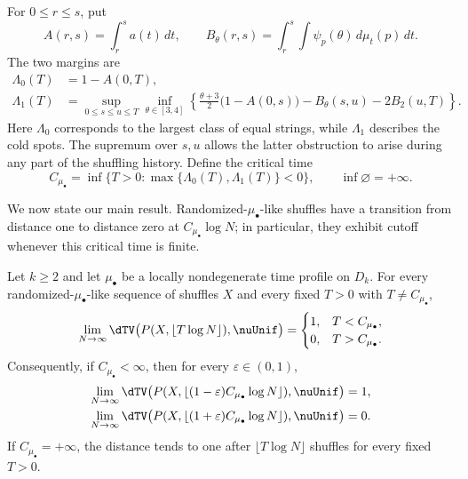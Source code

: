For $0\le r\le s$, put
\begin{equation}\label{eq:intro-integrated-costs}
 A(r,s)=\int_r^s a(t)\,dt,\qquad
 B_\theta(r,s)=\int_r^s\int\psi_p(\theta)\,d\mu_t(p)\,dt.
\end{equation}
The two margins are
\begin{align}
 \Lambda_0(T)&=1-A(0,T),\label{eq:intro-largest-margin}\\
 \Lambda_1(T)&=\sup_{0\le s\le u\le T}\inf_{\theta\in[3,4]}
 \left\{\frac{\theta+3}{2}\bigl(1-A(0,s)\bigr)
        -B_\theta(s,u)-2B_2(u,T)\right\}.
 \label{eq:intro-cold-margin}
\end{align}
Here $\Lambda_0$ corresponds to the largest class of equal strings,
while $\Lambda_1$ describes the cold spots. The supremum over $s,u$
allows the latter obstruction to arise during any part of the shuffling
history. Define the critical time
\begin{equation}\label{eq:profile-critical-time}
 C_{\mu_\bullet}
 =\inf\{T>0:\max\{\Lambda_0(T),\Lambda_1(T)\}<0\},
 \qquad \inf\varnothing=+\infty.
\end{equation}

We now state our main result. Randomized-$\mu_\bullet$-like shuffles
have a transition from distance one to distance zero at
$C_{\mu_\bullet}\log N$; in particular, they exhibit cutoff whenever
this critical time is finite.

\begin{theorem}\label{thm:main}
Let $k\ge2$ and let $\mu_\bullet$ be a locally nondegenerate time
profile on $D_k$. For every randomized-$\mu_\bullet$-like sequence
of shuffles $X$ and every fixed $T>0$ with $T\ne C_{\mu_\bullet}$,
\begin{equation}\label{eq:main-profile-limit}
 \lim_{N\to\infty}
 \dTV\bigl(P(X,\lfloor T\log N\rfloor),\nuUnif\bigr)
 =\begin{cases}
   1,&T<C_{\mu_\bullet},\\
   0,&T>C_{\mu_\bullet}.
  \end{cases}
\end{equation}
Consequently, if $C_{\mu_\bullet}<\infty$, then for every
$\varepsilon\in(0,1)$,
\begin{align}
 \lim_{N\to\infty}
 \dTV\bigl(P(X,\lfloor(1-\varepsilon)C_{\mu_\bullet}\log N\rfloor),
                  \nuUnif\bigr)&=1,\label{eq:main-cutoff-lower}\\
 \lim_{N\to\infty}
 \dTV\bigl(P(X,\lfloor(1+\varepsilon)C_{\mu_\bullet}\log N\rfloor),
                  \nuUnif\bigr)&=0.\label{eq:main-cutoff-upper}
\end{align}
If $C_{\mu_\bullet}=+\infty$, the distance tends to one after
$\lfloor T\log N\rfloor$ shuffles for every fixed $T>0$.
\end{theorem}


